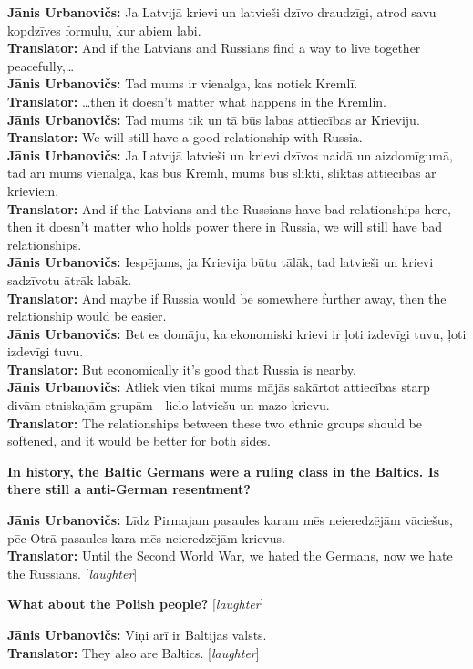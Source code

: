 \textbf{Jānis Urbanovičs:} Ja Latvijā krievi un latvieši dzīvo draudzīgi, atrod savu kopdzīves formulu, kur abiem labi.\\  
\textbf{Translator:} And if the Latvians and Russians find a way to live together peacefully,…\\ 
\textbf{Jānis Urbanovičs:} Tad mums ir vienalga, kas notiek Kremlī.\\ 
\textbf{Translator:} …then it doesn't matter what happens in the Kremlin.\\  
\textbf{Jānis Urbanovičs:} Tad mums tik un tā būs labas attiecības ar Krieviju.\\
\textbf{Translator:} We will still have a good relationship with Russia. \\ 
\textbf{Jānis Urbanovičs:} Ja Latvijā latvieši un krievi dzīvos naidā un aizdomīgumā, tad arī mums vienalga, kas būs Kremlī, mums būs slikti, sliktas attiecības ar krieviem.\\ 
\textbf{Translator:} And if the Latvians and the Russians have bad relationships here, then it doesn't matter who holds power there in Russia, we will still have bad relationships.\\  
\textbf{Jānis Urbanovičs:} Iespējams, ja Krievija būtu tālāk, tad latvieši un krievi sadzīvotu ātrāk labāk.\\ 
\textbf{Translator:} And maybe if Russia would be somewhere further away, then the relationship would be easier.\\
\textbf{Jānis Urbanovičs:} Bet es domāju, ka ekonomiski krievi ir ļoti izdevīgi tuvu, ļoti izdevīgi tuvu.\\
\textbf{Translator:} But economically it's good that Russia is nearby.\\ 
\textbf{Jānis Urbanovičs:} Atliek vien tikai mums mājās sakārtot attiecības starp divām etniskajām grupām - lielo latviešu un mazo krievu.\\  
\textbf{Translator:} The relationships between these two ethnic groups should be softened, and it would be better for both sides. 

\textbf{In history, the Baltic Germans were a ruling class in the Baltics. Is there still a anti-German resentment?} 

\textbf{Jānis Urbanovičs:} Līdz Pirmajam pasaules karam mēs neieredzējām vāciešus, pēc Otrā pasaules kara mēs neieredzējām krievus.\\ 
\textbf{Translator:} Until the Second World War, we hated the Germans, now we hate the Russians. [\textit{laughter}]  

\textbf{What about the Polish people?} [\textit{laughter}]  

\textbf{Jānis Urbanovičs:} Viņi arī ir Baltijas valsts. \\
\textbf{Translator:} They also are Baltics. [\textit{laughter}] 
